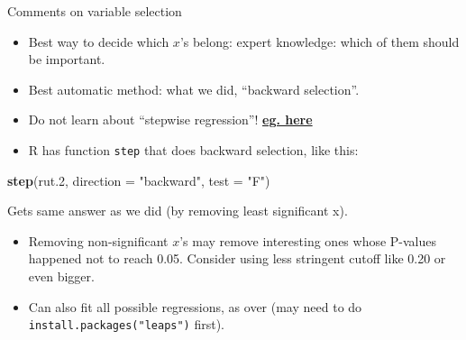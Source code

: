 \documentclass[
  ignorenonframetext,
]{beamer}
\newenvironment{Shaded}{\begin{snugshade}}{\end{snugshade}}
\newcommand{\DataTypeTok}[1]{\textcolor[rgb]{0.13,0.29,0.53}{#1}}
\newcommand{\FloatTok}[1]{\textcolor[rgb]{0.00,0.00,0.81}{#1}}
\newcommand{\KeywordTok}[1]{\textcolor[rgb]{0.13,0.29,0.53}{\textbf{#1}}}
\newcommand{\NormalTok}[1]{#1}
\newcommand{\StringTok}[1]{\textcolor[rgb]{0.31,0.60,0.02}{#1}}
\providecommand{\tightlist}{%
  \setlength{\itemsep}{0pt}\setlength{\parskip}{0pt}}
\begin{document}
\begin{frame}[fragile]{Comments on variable selection}
\protect\hypertarget{comments-on-variable-selection}{}

\begin{itemize}
\tightlist
\item
  Best way to decide which \(x\)'s belong: expert knowledge: which of
  them should be important.
\item
  Best automatic method: what we did, ``backward selection''.
\item
  Do not learn about ``stepwise regression''!
  \href{https://towardsdatascience.com/stopping-stepwise-why-stepwise-selection-is-bad-and-what-you-should-use-instead-90818b3f52df}{\textbf{eg.
  here}}
\item
  R has function \texttt{step} that does backward selection, like this:
\end{itemize}

\begin{Shaded}
\begin{Highlighting}[]
\KeywordTok{step}\NormalTok{(rut}\FloatTok{.2}\NormalTok{, }\DataTypeTok{direction =} \StringTok{"backward"}\NormalTok{, }\DataTypeTok{test =} \StringTok{"F"}\NormalTok{)}
\end{Highlighting}
\end{Shaded}

Gets same answer as we did (by removing least significant x).

\begin{itemize}
\tightlist
\item
  Removing non-significant \(x\)'s may remove interesting ones whose
  P-values happened not to reach 0.05. Consider using less stringent
  cutoff like 0.20 or even bigger.
\item
  Can also fit all possible regressions, as over (may need to do
  \texttt{install.packages("leaps")} first).
\end{itemize}

\end{frame}
\end{document}
